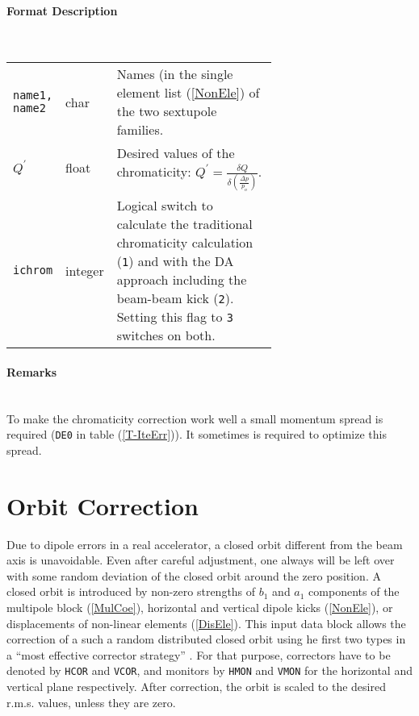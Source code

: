 \paragraph{Format Description}~

\bigskip
\begin{longtabu}{@{}llp{0.65\linewidth}}
    \texttt{name1, name2} & char    & Names (in the single element list (\ref{NonEle}) of the two sextupole families. \\
    \texttt{$Q^\prime$}   & float   & Desired values of the chromaticity: $Q^\prime=\frac{\delta Q}{\delta( \frac{\Delta p}{p_o})}$. \\
    \texttt{ichrom}       & integer & Logical switch to calculate the traditional chromaticity calculation (\texttt{1}) and with the DA approach including the beam-beam kick (\texttt{2}). Setting this flag to \texttt{3} switches on both. \\
\end{longtabu}

\paragraph{Remarks}~\\

To make the chromaticity correction work well a small momentum spread is required (\texttt{DE0} in table (\ref{T-IteErr})).
It sometimes is required to optimize this spread.

\section{Orbit Correction} \label{OrbCorr}

Due to dipole errors in a real accelerator, a closed orbit different from the beam axis is unavoidable.
Even after careful adjustment, one always will be left over with some random deviation of the closed orbit around the zero position.
A closed orbit is introduced by non-zero strengths of $b_{1}$ and $a_{1}$ components of the multipole block (\ref{MulCoe}), horizontal and vertical dipole kicks (\ref{NonEle}), or displacements of non-linear elements (\ref{DisEle}).
This input data block allows the correction of a such a random distributed closed orbit using he first two types in a ``most effective corrector strategy'' \cite{Auti}.
For that purpose, correctors have to be denoted by \texttt{HCOR} and \texttt{VCOR}, and monitors by \texttt{HMON} and \texttt{VMON} for the horizontal and vertical plane respectively.
After correction, the orbit is scaled to the desired r.m.s. values, unless they are zero.

